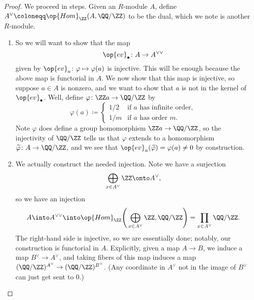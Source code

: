 \documentclass[../notes.tex]{subfiles}
\begin{document}
\begin{proof}
	We proceed in steps. Given an $R$-module $A$, define $A^\lor\coloneqq\op{Hom}_\ZZ(A,\QQ/\ZZ)$ to be the dual, which we note is another $R$-module.
	\begin{enumerate}
		\item So we will want to show that the map
		\[\op{ev}_\bullet\colon A\to A^{\lor\lor}\]
		given by $\op{ev}_a\colon\varphi\mapsto\varphi(a)$ is injective. This will be enough because the above map is functorial in $A$. We now show that this map is injective, so suppose $a\in A$ is nonzero, and we want to show that $a$ is not in the kernel of $\op{ev}_\bullet$. Well, define $\varphi\colon\ZZ a\to\QQ/\ZZ$ by
		\[\varphi(a)\coloneqq\begin{cases}
			1/2 & \text{if }a\text{ has infinite order}, \\
			1/m & \text{if }a\text{ has order }m.
		\end{cases}\]
		Note $\varphi$ does define a group homomorphism $\ZZ a\to\QQ/\ZZ$, so the injectivity of $\QQ/\ZZ$ tells us that $\varphi$ extends to a homomorphism $\widetilde\varphi\colon A\to\QQ/\ZZ$, and we see that $\op{ev}_a(\widetilde\varphi)=\varphi(a)\ne0$ by construction.

		\item We actually construct the needed injection. Note we have a surjection
		\[\bigoplus_{x\in A^\lor}\ZZ\onto A^\lor,\]
		so we have an injection
		\[A\into A^{\lor\lor}\into\op{Hom}_\ZZ\Bigg(\bigoplus_{x\in A^\lor}\ZZ,\QQ/\ZZ\Bigg)=\prod_{x\in A^\lor}\QQ/\ZZ.\]
		The right-hand side is injective, so we are essentially done; notably, our construction is functorial in $A$. Explicitly, given a map $A\to B$, we induce a map $B^\lor\to A^\lor$, and taking fibers of this map induces a map $(\QQ/\ZZ)^{A^\lor}\to(\QQ/\ZZ)^{B^\lor}$. (Any coordinate in $A^\lor$ not in the image of $B^\lor$ can just get sent to $0$.)
		\qedhere
	\end{enumerate}
\end{proof}
\end{document}
